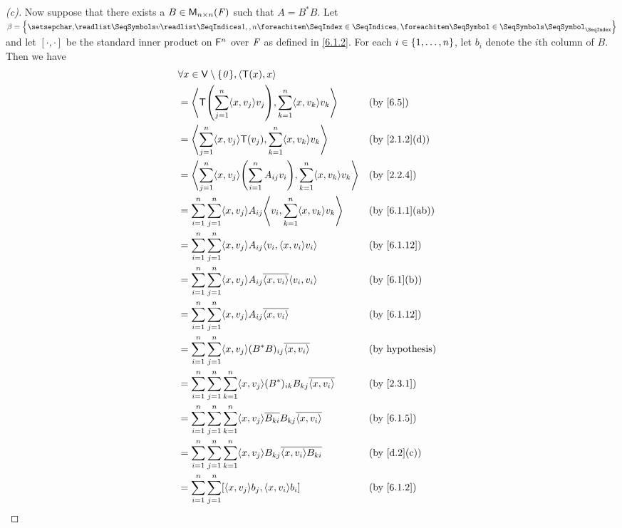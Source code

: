 \begin{proof}[(c)]
	Now suppose that there exists a \(B \in \ms[n][n][\F]\) such that \(A = B^* B\).
	Let \(\beta = \set{\seq{v}{1,,n}}\) and let \([\cdot, \cdot]\) be the standard inner product on \(\mathsf{F}^n\) over \(\mathit{F}\) as defined in \cref{6.1.2}.
	For each \(i \in \left\lbrace1, \dots, n\right\rbrace\), let \(b_i\) denote the \(i\)th column of \(B\).
	Then we have
	\begin{align*}
		 & \forall x \in \V \setminus \set{\zv}, \inn{\T(x), x}                                                                               \\
		 & = \inn{\T\pa{\sum_{j = 1}^n \inn{x, v_j} v_j}, \sum_{k = 1}^n \inn{x, v_k} v_k}                        &  & \by{6.5}               \\
		 & = \inn{\sum_{j = 1}^n \inn{x, v_j} \T(v_j), \sum_{k = 1}^n \inn{x, v_k} v_k}                           &  & \by{2.1.2}[d]          \\
		 & = \inn{\sum_{j = 1}^n \inn{x, v_j} \pa{\sum_{i = 1}^n A_{i j} v_i}, \sum_{k = 1}^n \inn{x, v_k} v_k}   &  & \by{2.2.4}             \\
		 & = \sum_{i = 1}^n \sum_{j = 1}^n \inn{x, v_j} A_{i j} \inn{v_i, \sum_{k = 1}^n \inn{x, v_k} v_k}        &  & \by{6.1.1}[ab]         \\
		 & = \sum_{i = 1}^n \sum_{j = 1}^n \inn{x, v_j} A_{i j} \inn{v_i, \inn{x, v_i} v_i}                       &  & \by{6.1.12}            \\
		 & = \sum_{i = 1}^n \sum_{j = 1}^n \inn{x, v_j} A_{i j} \conj{\inn{x, v_i}} \inn{v_i, v_i}                &  & \by{6.1}[b]            \\
		 & = \sum_{i = 1}^n \sum_{j = 1}^n \inn{x, v_j} A_{i j} \conj{\inn{x, v_i}}                               &  & \by{6.1.12}            \\
		 & = \sum_{i = 1}^n \sum_{j = 1}^n \inn{x, v_j} (B^* B)_{i j} \conj{\inn{x, v_i}}                         &  & \text{(by hypothesis)} \\
		 & = \sum_{i = 1}^n \sum_{j = 1}^n \sum_{k = 1}^n \inn{x, v_j} (B^*)_{i k} B_{k j} \conj{\inn{x, v_i}}    &  & \by{2.3.1}             \\
		 & = \sum_{i = 1}^n \sum_{j = 1}^n \sum_{k = 1}^n \inn{x, v_j} \conj{B_{k i}} B_{k j} \conj{\inn{x, v_i}} &  & \by{6.1.5}             \\
		 & = \sum_{i = 1}^n \sum_{j = 1}^n \sum_{k = 1}^n \inn{x, v_j} B_{k j} \conj{\inn{x, v_i} B_{k i}}        &  & \by{d.2}[c]            \\
		 & = \sum_{i = 1}^n \sum_{j = 1}^n [\inn{x, v_j} b_j, \inn{x, v_i} b_i]                                   &  & \by{6.1.2}             \\

\end{align*}
\end{proof}
